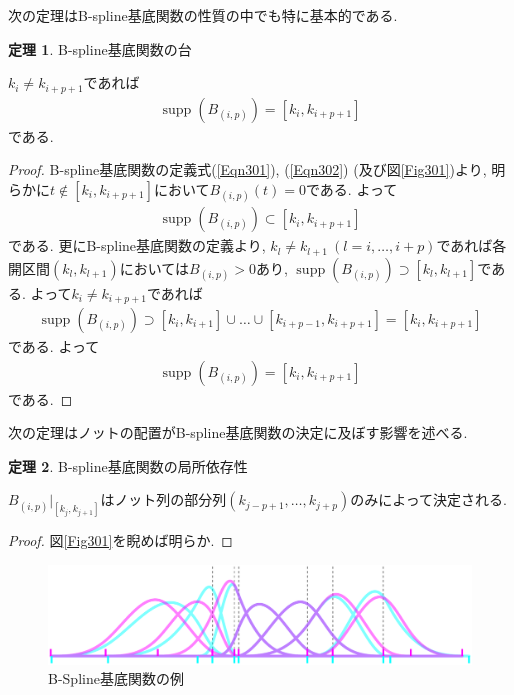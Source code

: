 \documentclass{jsarticle}
\newcommand\pare[1]{(#1)}
\DeclareMathOperator{\supp}{supp}
\theoremstyle{definition}%
\newtheorem{thm}{定理}
\begin{document}
\newpage
次の定理はB-spline基底関数の性質の中でも特に基本的である.
\begin{screen}
	\begin{thm}
		\label{Thm301}
		B-spline基底関数の台

		$k_{i}\neq k_{i+p+1}$であれば
		\begin{align}
			\supp(B_{(i,p)})=[k_{i}, k_{i+p+1}]
		\end{align}
		である.
	\end{thm}
\end{screen}
\begin{proof}
	B-spline基底関数の定義式(\ref{Eqn301}), (\ref{Eqn302}) (及び図\ref{Fig301})より, 明らかに$t\not\in[k_{i}, k_{i+p+1}]$において$B_{(i,p)}(t)=0$である.
	よって
	\begin{align}
		\supp(B_{(i,p)})\subset[k_{i}, k_{i+p+1}]
	\end{align}
	である.
	更にB-spline基底関数の定義より, $k_l\neq k_{l+1} \ (l=i,\dots,i+p)$であれば各開区間$(k_{l}, k_{l+1})$においては$B_{(i,p)}> 0$あり, $\supp(B_{(i,p)})\supset[k_l, k_{l+1}]$である.
	よって$k_{i}\neq k_{i+p+1}$であれば
	\begin{align}
		\supp(B_{(i,p)})\supset[k_{i}, k_{i+1}]\cup\dots\cup[k_{i+p-1}, k_{i+p+1}]=[k_{i}, k_{i+p+1}]
	\end{align}
	である.
	よって
	\begin{align}
		\supp(B_{(i,p)})=[k_{i}, k_{i+p+1}]
	\end{align}
	である.
\end{proof}

次の定理はノットの配置がB-spline基底関数の決定に及ぼす影響を述べる.
\begin{screen}
	\begin{thm}
		\label{Thm302}
		B-spline基底関数の局所依存性

		$B_{(i,p)}|_{[k_j,k_{j+1}]}$はノット列の部分列$ \pare{k_{j-p+1}, \dots ,k_{j+p}} $のみによって決定される.
	\end{thm}
\end{screen}
\begin{proof}
    図\ref{Fig301}を睨めば明らか.
\end{proof}
\addtocounter{footnote}{-1}
\begin{figure}[htbp]
	\centering
    \includegraphics[page=1,clip,width=140mm]{figA.pdf}
	\caption{B-Spline基底関数の例\protect\footnotemark}
	\label{Fig303}
\end{figure}
\end{document}
